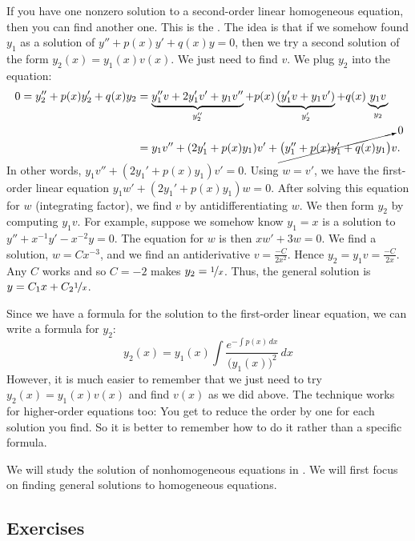 If you have one nonzero solution to a second-order linear homogeneous
equation, then you can find another one.  This is the \emph{}.  The idea is that if we somehow found $y_1$ as a solution of
$y'' + p(x) y' + q(x) y = 0$, then we try a second
solution of the form $y_2(x) = y_1(x) v(x)$.
We just need to find $v$.  We plug $y_2$ into the equation:
\begin{equation*}
\begin{split}
0 = 
y_2'' + p(x) y_2' + q(x) y_2
& =
\underbrace{y_1'' v + 2 y_1' v' + y_1 v''}_{y_2''}
+ p(x) \underbrace{( y_1' v + y_1 v' )}_{y_2'}
+ q(x) \underbrace{y_1 v}_{y_2}
\\
& =
y_1 v''
+ (2 y_1' + p(x) y_1) v'
+
\cancelto{0}{\bigl( y_1'' + p(x) y_1' + q(x) y_1 \bigr)} v .
\end{split}
\end{equation*}
In other words,
$y_1 v'' + (2 y_1' + p(x) y_1) v' = 0$.  Using $w = v'$, we have the
first-order linear equation
$y_1 w' + (2 y_1' + p(x) y_1) w = 0$.  After solving this equation for $w$
(integrating factor),
we find $v$ by antidifferentiating $w$.  We then form $y_2$ by computing
$y_1 v$.  For example, suppose we somehow know $y_1 = x$ is a solution
to $y''+x^{-1}y'-x^{-2} y=0$.
The equation for $w$ is then
$xw' + 3 w = 0$.  We find a solution, $w = Cx^{-3}$, and we find an 
antiderivative $v = \frac{-C}{2x^2}$.
Hence $y_2 = y_1 v = \frac{-C}{2x}$.
Any $C$ works and so $C=-2$ makes $y_2 = \nicefrac{1}{x}$.  Thus, the
general solution is $y = C_1 x + C_2\nicefrac{1}{x}$.

Since we have a formula for the solution to the first-order linear equation,
we can write a formula for $y_2$:
\begin{equation*}
y_2(x) = y_1(x) \int \frac{e^{-\int p(x)\,dx}}{{\bigl(y_1(x)\bigr)}^2} \,dx
\end{equation*}
However, it is much easier to remember that we just need to try $y_2(x) =
y_1(x) v(x)$ and find $v(x)$ as we did above.  The technique
works for higher-order equations too: You get to reduce the order by one for each
solution you find.  So it is better to remember how to do
it rather than a specific formula.

\medskip

We will study the solution of nonhomogeneous equations in
.  We will first focus on finding general solutions to
homogeneous equations.


\subsection{Exercises}

